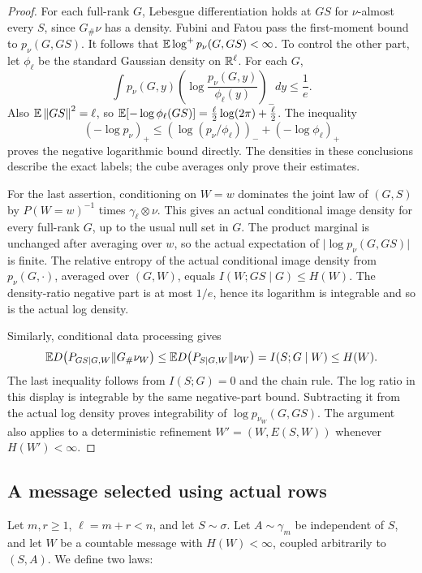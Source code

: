 \begin{proof}
For each full-rank \(G\), Lebesgue differentiation holds at \(GS\)
for \(\nu\)-almost every \(S\), since \(G_\#\nu\) has a density.
Fubini and Fatou pass the first-moment bound to \(p_\nu(G,GS)\).
It follows that \(\mathbb E\log^+p_\nu(G,GS)<\infty\).  To control the
other part, let \(\phi_\ell\) be the standard Gaussian density on
\(\mathbb R^\ell\).  For each \(G\),
\[
 \int p_\nu(G,y)
       \left(\log\frac{p_\nu(G,y)}{\phi_\ell(y)}\right)_-dy
 \le\frac1e.
\]
Also \(\mathbb E\left\lVert GS\right\rVert^2=\ell\), so
\(\mathbb E[-\log\phi_\ell(GS)]=\frac{\ell}{2}\log(2\pi)+\frac{\ell}{2}\).
The inequality
\[
 (-\log p_\nu)_+
 \le\left(\log(p_\nu/\phi_\ell)\right)_-
        +(-\log\phi_\ell)_+
\]
proves the negative logarithmic bound directly.  The densities in
these conclusions describe the exact labels; the cube averages only
prove their estimates.

For the last assertion, conditioning on \(W=w\) dominates the joint
law of \((G,S)\) by \(P(W=w)^{-1}\) times
\(\gamma_\ell\otimes\nu\).  This gives an actual conditional image
density for every full-rank \(G\), up to the usual null set in \(G\).
The product marginal is unchanged after averaging over \(w\), so the
actual expectation of \(\lvert\log p_\nu(G,GS)\rvert\) is finite.
The relative entropy of the actual conditional image density from
\(p_\nu(G,\cdot)\), averaged over \((G,W)\), equals
\(I(W;GS\mid G)\le H(W)\).  The density-ratio negative part is at
most \(1/e\), hence its logarithm is integrable and so is the actual
log density.

Similarly, conditional data processing gives
\[
 \mathbb E D\bigl(P_{GS\mid G,W}\Vert G_\#\nu_W\bigr)
 \le \mathbb E D\bigl(P_{S\mid G,W}\Vert\nu_W\bigr)
 =I(S;G\mid W)\le H(W).
\]
The last inequality follows from \(I(S;G)=0\) and the chain rule.
The log ratio in this display is integrable by the same negative-part
bound.  Subtracting it from the actual log density proves integrability
of \(\log p_{\nu_W}(G,GS)\).  The argument also applies to a
deterministic refinement \(W'=(W,E(S,W))\) whenever \(H(W')<\infty\).
\end{proof}

\subsection{A message selected using actual rows}
\label{subsec:r-two-experiments}

Let \(m,r\ge1\), \(\ell=m+r<n\), and let \(S\sim\sigma\).
Let \(A\sim\gamma_m\) be independent of \(S\), and let \(W\) be a
countable message with \(H(W)<\infty\), coupled arbitrarily to
\((S,A)\).  We define two laws:

